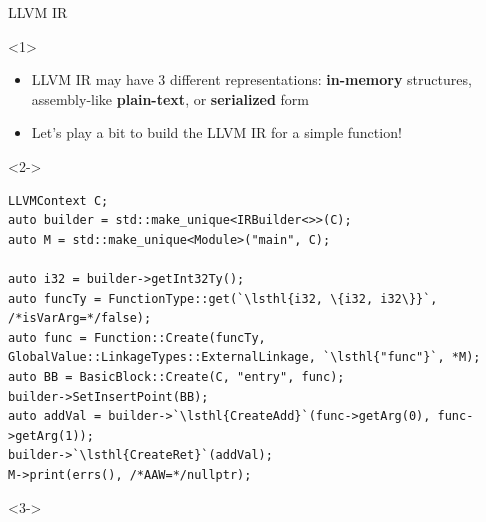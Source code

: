 \begin{frame}[fragile]{LLVM IR}
  \begin{onlyenv}<1>
   \begin{itemize}
      \itemsep=1ex

    \item LLVM IR may have 3 different representations: \textbf{in-memory} structures, assembly-like \textbf{plain-text}, or \textbf{serialized} form
    \item Let's play a bit to build the LLVM IR for a simple function!
    \end{itemize}
  \end{onlyenv}

  \begin{onlyenv}<2->
    \begin{lstlisting}[style=c++]
LLVMContext C;
auto builder = std::make_unique<IRBuilder<>>(C);
auto M = std::make_unique<Module>("main", C);

auto i32 = builder->getInt32Ty();
auto funcTy = FunctionType::get(`\lsthl{i32, \{i32, i32\}}`, /*isVarArg=*/false);
auto func = Function::Create(funcTy, GlobalValue::LinkageTypes::ExternalLinkage, `\lsthl{"func"}`, *M);
auto BB = BasicBlock::Create(C, "entry", func);
builder->SetInsertPoint(BB);
auto addVal = builder->`\lsthl{CreateAdd}`(func->getArg(0), func->getArg(1));
builder->`\lsthl{CreateRet}`(addVal);
M->print(errs(), /*AAW=*/nullptr);
    \end{lstlisting}
  \end{onlyenv}

  \begin{onlyenv}<3->
  \end{onlyenv}

\end{frame}

